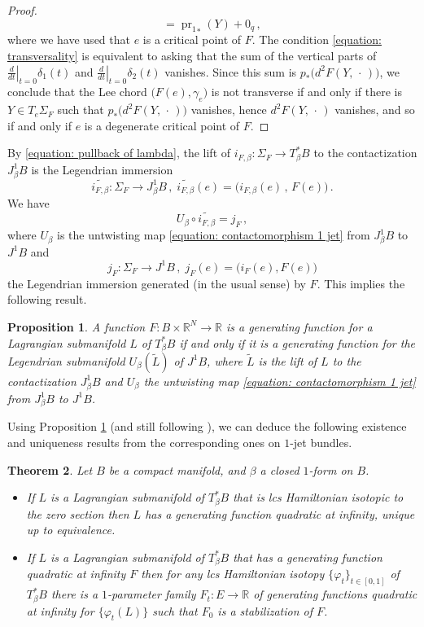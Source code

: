 \documentclass{amsart}
\DeclareMathOperator{\pr}{pr}
\newtheorem{thm}{Theorem}[section]
\newtheorem{prop}[thm]{Proposition}
\theoremstyle{remark}
\begin{document}
\begin{proof}
$$= {\pr_1}_{*} (Y) + 0_q \,,
$$
where we have used that $e$ is a critical point of $F$.
The condition \eqref{equation: transversality}
is equivalent to asking that the sum of the vertical parts
of $\left. \frac{d}{dt} \right\lvert_{t=0} \delta_1(t)$
and $\left. \frac{d}{dt} \right\lvert_{t=0} \delta_2(t)$
vanishes.
Since this sum
is $p_{\ast} \big(d^2F (Y, \,\cdot\,)\big)$,
we conclude that 
the Lee chord $\big( F(e), \gamma_e \big)$ is not transverse
if and only if there is $Y \in T_e\Sigma_F$
such that $p_{\ast} \big(d^2F (Y, \,\cdot\,)\big)$ vanishes,
hence $d^2F (Y, \,\cdot\,)$ vanishes,
and so if and only if $e$ is a degenerate critical point of $F$.
\end{proof}

By \eqref{equation: pullback of lambda},
the lift of $i_{F, \beta}: \Sigma_F \rightarrow T_{\beta}^{\ast}B$
to the contactization $J_{\beta}^1B$
is the Legendrian immersion
\[
\widetilde{i_{F, \beta}}: \Sigma_F \rightarrow J_{\beta}^1B \,,\;
\widetilde{i_{F, \beta}}(e) = \big( i_{F, \beta}(e) \,,\, F(e) \big) \,.
\]
We have
\[
U_{\beta} \circ \widetilde{i_{F, \beta}} = j_F \,,
\]
where $U_{\beta}$ is the untwisting map \eqref{equation: contactomorphism 1 jet}
from $J^1_{\beta}B$ to $J^1B$
and
\[
j_F: \Sigma_F \rightarrow J^1B \,,\;
j_F(e) = \big( i_F(e), F(e) \big)
\]
the Legendrian immersion generated (in the usual sense) by $F$.
This implies the following result.

\begin{prop}\label{proposition: relation gf 1 jet}
A function $F: B \times \mathbb{R}^N \rightarrow \mathbb{R}$
is a generating function for a Lagrangian submanifold $L$ of $T_{\beta}^{\ast}B$
if and only if it is a generating function for the Legendrian submanifold
$U_{\beta} (\widetilde{L})$ of $J^1B$,
where $\widetilde{L}$ is the lift of $L$
to the contactization $J_{\beta}^1B$
and $U_{\beta}$ the untwisting map \eqref{equation: contactomorphism 1 jet}
from $J^1_{\beta}B$ to $J^1B$.
\end{prop}

Using Proposition \ref{proposition: relation gf 1 jet}
(and still following \cite{CM}),
we can deduce the following existence and uniqueness results
from the corresponding ones on $1$-jet bundles.

\begin{thm}\label{theorem: gf}
Let $B$ be a compact manifold,
and $\beta$ a closed $1$-form on $B$.
\begin{itemize}
\item[(i)] If $L$ is a Lagrangian submanifold of $T^{\ast}_{\beta} B$
that is lcs Hamiltonian isotopic to the zero section
then $L$ has a generating function quadratic at infinity,
unique up to equivalence.
\item[(ii)] If $L$ is a Lagrangian submanifold of $T^{\ast}_{\beta} B$
that has a generating function quadratic at infinity $F$
then for any lcs Hamiltonian isotopy
$\{\varphi_t\}_{t \in [0,1]}$ of $T^{\ast}_{\beta} B$
there is a $1$-parameter family $F_t: E \rightarrow \mathbb{R}$
of generating functions quadratic at infinity for $\{\varphi_t(L)\}$
such that $F_0$ is a stabilization of $F$.
\end{itemize}
\end{thm}
\end{document}
